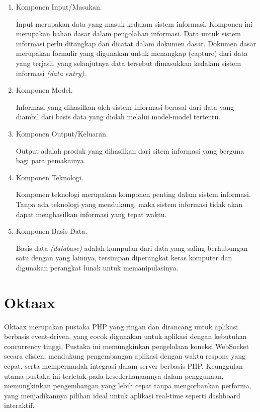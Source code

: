 	\begin{enumerate}
	  	\item Komponen Input/Masukan.
			\par Input merupakan data yang masuk kedalam sistem informasi. Komponen ini merupakan bahan dasar dalam pengolahan informasi. Data untuk sistem informasi perlu ditangkap dan dicatat dalam dokumen dasar. Dokumen dasar merupakan formulir yang digunakan untuk menangkap (capture) dari data yang terjadi, yang selanjutnya data tersebut dimasukkan kedalam sistem informasi \textit{(data entry)}.
	 	 \item Komponen Model.
			\par Informasi yang dihasilkan oleh sistem informasi berasal dari data yang diambil dari basis data yang diolah melalui model-model tertentu.
		\item Komponen Output/Keluaran.
			\par Output adalah produk yang dihasilkan dari sitem informasi yang berguna bagi para pemakainya.
	 	 \item Komponen Teknologi.
			\par Komponen teknologi merupakan komponen penting dalam sistem informasi. Tanpa ada teknologi yang mendukung, maka sistem informasi tidak akan dapat menghasilkan informasi yang tepat waktu.
		\item Komponen Basis Data.
			\par Basis data \textit{(database)} adalah kumpulan dari data yang saling berhubungan satu dengan yang lainnya, tersimpan diperangkat keras komputer dan digunakan perangkat lunak untuk memanipulasinya.
	\end{enumerate}
\section{Oktaax}
\par Oktaax merupakan pustaka PHP yang ringan dan dirancang untuk aplikasi berbasis event-driven, yang cocok digunakan untuk aplikasi dengan kebutuhan concurrency tinggi. Pustaka ini memungkinkan pengelolaan koneksi WebSocket secara efisien, mendukung pengembangan aplikasi dengan waktu respons yang cepat, serta mempermudah integrasi dalam server berbasis PHP. Keunggulan utama pustaka ini terletak pada kesederhanaannya dalam penggunaan, memungkinkan pengembangan yang lebih cepat tanpa mengorbankan performa, yang menjadikannya pilihan ideal untuk aplikasi real-time seperti dashboard interaktif.
